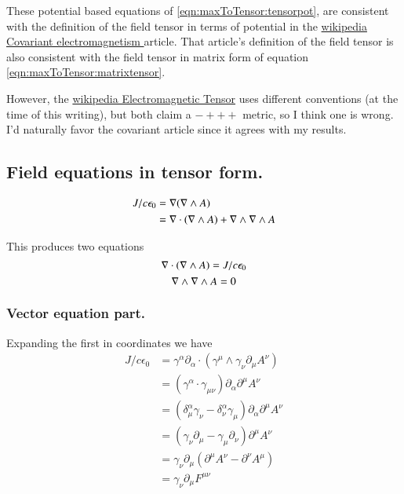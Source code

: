 These potential based equations of \ref{eqn:maxToTensor:tensorpot}, are consistent with the definition of the field tensor in terms of potential in the 
\href{http://en.wikipedia.org/wiki/Covariant\_formulation\_of\_classical\_electromagnetism}{ wikipedia Covariant electromagnetism } article.
That article's definition of the field tensor is also consistent with the field tensor in matrix form of equation \ref{eqn:maxToTensor:matrixtensor}.

However, the \href{http://en.wikipedia.org/wiki/Electromagnetic_tensor}{wikipedia Electromagnetic Tensor}
uses different conventions (at the time of this writing), but both claim a $-+++$ metric, so I think one is wrong.  I'd naturally favor the
covariant article since it agrees with my results.

\subsection{Field equations in tensor form. }

\begin{align*}
J/c \epsilon_0 
&= \nabla (\nabla \wedge A) \\
&= \nabla \cdot ( \nabla \wedge A ) + \nabla \wedge \nabla \wedge A \\
\end{align*}

This produces two equations
\begin{equation*}
\nabla \cdot ( \nabla \wedge A ) = J/c \epsilon_0 
\end{equation*}
\begin{equation*}
\nabla \wedge \nabla \wedge A = 0
\end{equation*}

\subsubsection{Vector equation part. } 

Expanding the first in coordinates we have
\begin{align*}
J/c \epsilon_0 
&= \gamma^{\alpha} \partial_{\alpha} \cdot ( \gamma^{\mu} \wedge \gamma_{\nu} \partial_{\mu} A^{\nu} ) \\
&= (\gamma^{\alpha} \cdot \gamma_{\mu\nu}) \partial_{\alpha} \partial^{\mu} A^{\nu} \\
&= (
\delta^{\alpha}_{\mu} \gamma_{\nu}
-\delta^{\alpha}_{\nu} \gamma_{\mu}
) \partial_{\alpha} \partial^{\mu} A^{\nu} \\
&= ( \gamma_{\nu} \partial_{\mu} - \gamma_{\mu} \partial_{\nu} ) \partial^{\mu} A^{\nu} \\
&= \gamma_{\nu} \partial_{\mu} (\partial^{\mu} A^{\nu} -\partial^{\nu} A^{\mu} ) \\
&= \gamma_{\nu} \partial_{\mu} F^{\mu\nu}
\end{align*}

